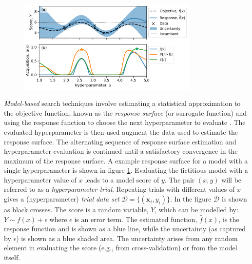 \begin{figure}
    \centering
    \includegraphics[width=0.8\textwidth]{chapters/msm_optimization/figures/response_surface_explainer.png}
    \label{fig:msm_rsm_explainer}
\end{figure}

\emph{Model-based} search techniques involve estimating a statistical approximation to the objective function, known  as the \emph{response surface} (or surrogate function) and using the response function to choose the next hyperparameter to evaluate \cite{hutterSequentialModelbasedOptimization2011}. The evaluated hyperparameter is then used augment the data used to estimate the response surface.\cite{hutterSequentialModelbasedOptimization2011} The alternating sequence of response surface estimation and hyperparameter evaluation is continued until a satisfactory convergence in the maximum of the response surface.\cite{hutterSequentialModelbasedOptimization2011}  A example response surface for a model with a single hyperparameter is shown in figure \ref{fig:msm_rsm_explainer}. Evaluating the fictitious model with a hyperparameter value of $x$ leads to a model score of $y$. The pair $(x, y)$ will be referred to as a \emph{hyperparameter trial}. Repeating trials with different values of $x$ gives a (hyperparameter) \emph{trial data set}  $\mathcal{D}=\{(\mathbf{x}_{i}, y_{i})\}$. In the figure $\mathcal{D}$ is shown as black crosses. The score is a random variable, $Y$, which can be modelled by: $Y \sim f(x) + \epsilon$ where $\epsilon$ is an error term. The estimated function, $\hat{f}(x)$, is the response function and is shown as a blue line, while the uncertainty (as captured by $\epsilon$) is shown as a blue shaded area. The uncertainty arises from any random element in evaluating the score (e.g., from cross-validation) or from the model itself.  

